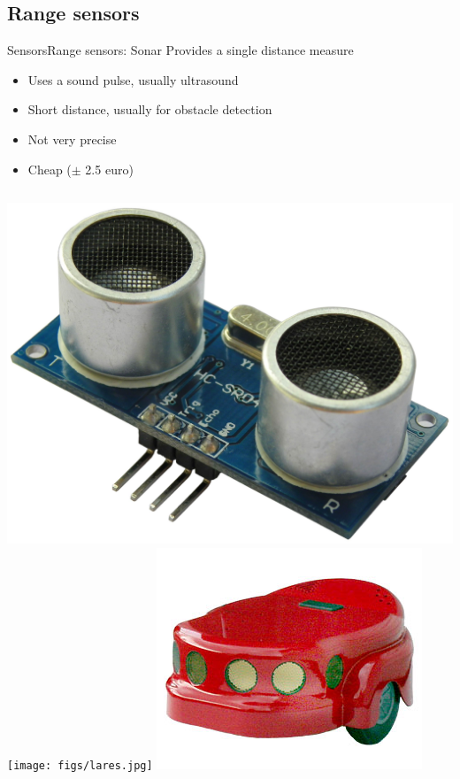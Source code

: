 \documentclass[10pt,compress]{beamer} %
\begin{document}
\subsection{Range sensors}
\begin{frame}{Sensors}{Range sensors: Sonar}
	Provides a single distance measure
	\begin{itemize}
		\item Uses a sound pulse, usually ultrasound
		\item Short distance, usually for obstacle detection
		\item Not very precise
		\item Cheap ($\pm$ 2.5 euro)
	\end{itemize}
	\begin{center}
	\begin{columns}
	\includegraphics[width=\linewidth]{figs/ultrasound.jpg}
	\texttt{[image: figs/lares.jpg]}
	\includegraphics[width=\linewidth]{figs/amigobot.jpg}
	\end{columns}
	\end{center}
\end{frame}
\end{document}
